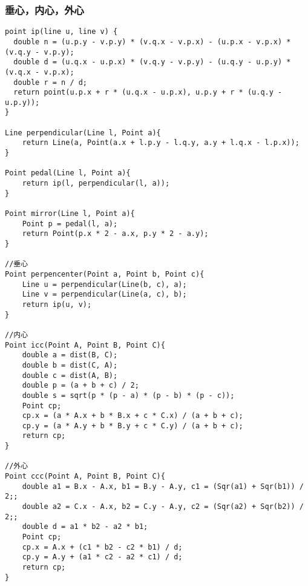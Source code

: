 \subsubsection{垂心，内心，外心}
\begin{verbatim}
point ip(line u, line v) {
  double n = (u.p.y - v.p.y) * (v.q.x - v.p.x) - (u.p.x - v.p.x) * (v.q.y - v.p.y);
  double d = (u.q.x - u.p.x) * (v.q.y - v.p.y) - (u.q.y - u.p.y) * (v.q.x - v.p.x);
  double r = n / d;
  return point(u.p.x + r * (u.q.x - u.p.x), u.p.y + r * (u.q.y - u.p.y));
}

Line perpendicular(Line l, Point a){
    return Line(a, Point(a.x + l.p.y - l.q.y, a.y + l.q.x - l.p.x));
}

Point pedal(Line l, Point a){
    return ip(l, perpendicular(l, a));
}

Point mirror(Line l, Point a){
    Point p = pedal(l, a);
    return Point(p.x * 2 - a.x, p.y * 2 - a.y);
}

//垂心
Point perpencenter(Point a, Point b, Point c){
    Line u = perpendicular(Line(b, c), a);
    Line v = perpendicular(Line(a, c), b);
    return ip(u, v);
}

//内心
Point icc(Point A, Point B, Point C){
    double a = dist(B, C);
    double b = dist(C, A);
    double c = dist(A, B);
    double p = (a + b + c) / 2;
    double s = sqrt(p * (p - a) * (p - b) * (p - c));
    Point cp;
    cp.x = (a * A.x + b * B.x + c * C.x) / (a + b + c);
    cp.y = (a * A.y + b * B.y + c * C.y) / (a + b + c);
    return cp;
}

//外心
Point ccc(Point A, Point B, Point C){
    double a1 = B.x - A.x, b1 = B.y - A.y, c1 = (Sqr(a1) + Sqr(b1)) / 2;;
    double a2 = C.x - A.x, b2 = C.y - A.y, c2 = (Sqr(a2) + Sqr(b2)) / 2;;
    double d = a1 * b2 - a2 * b1;
    Point cp;
    cp.x = A.x + (c1 * b2 - c2 * b1) / d;
    cp.y = A.y + (a1 * c2 - a2 * c1) / d;
    return cp;
}
\end{verbatim}
